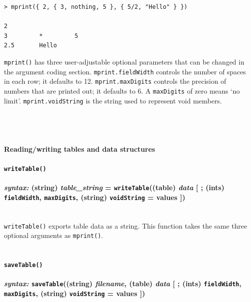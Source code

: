 \documentclass{article}
\newenvironment{code}{
       \begin{list}{}{
               \setlength{\leftmargin}{.4in}
               \setlength{\rightmargin}{0in}
               \setlength{\topsep}{.2in}
       }
       \small
       \item[] }
       { \end{list}   }
\begin{document}
\begin{code} \begin{verbatim}
> mprint({ 2, { 3, nothing, 5 }, { 5/2, "Hello" } })

2
3         *         5         
2.5       Hello     
\end{verbatim} \end{code}

\noindent \texttt{mprint()} has three user-adjustable optional parameters that can be changed in the argument coding section.  \verb#mprint.fieldWidth# controls the number of spaces in each row; it defaults to 12.  \verb#mprint.maxDigits# controls the precision of numbers that are printed out; it defaults to 6.  A \verb#maxDigits# of zero means `no limit'.  \verb#mprint.voidString# is the string used to represent void members.\\\\\\\\



\paragraph{Reading/writing tables and data structures}


\paragraph{\texttt{writeTable()}\\\\
\normalfont \emph{syntax: } (string) \emph{table\_string} = \texttt{writeTable}((table) \emph{data} [ ; (ints) \texttt{fieldWidth}, \texttt{maxDigits}, (string) \texttt{voidString} = values ])\\\\}

\texttt{writeTable()} exports table data as a string.  This function takes the same three optional arguments as \verb#mprint()#.\\\\



\paragraph{\texttt{saveTable()}\\\\
\normalfont \emph{syntax: } \texttt{saveTable}((string) \emph{filename}, (table) \emph{data} [ ; (ints) \texttt{fieldWidth}, \texttt{maxDigits}, (string) \texttt{voidString} = values ])\\\\}
\end{document}
